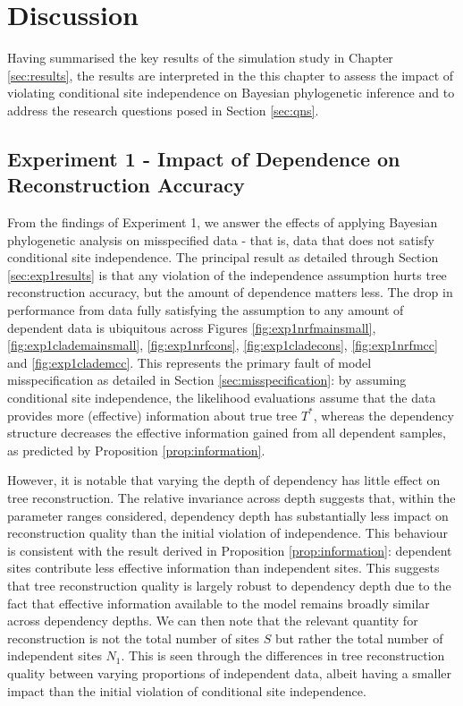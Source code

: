 \chapter{Discussion}
\label{sec:discussion}

Having summarised the key results of the simulation study in Chapter \ref{sec:results}, the results are interpreted in the this chapter to assess the impact of violating conditional site independence on Bayesian phylogenetic inference and to address the research questions posed in Section \ref{sec:qns}.

\section{Experiment 1 - Impact of Dependence on Reconstruction Accuracy}
\label{sec:discussionexp1}
From the findings of Experiment 1, we answer the effects of applying Bayesian phylogenetic analysis on misspecified data - that is, data that does not satisfy conditional site independence. The principal result as detailed through Section \ref{sec:exp1results} is that any violation of the independence assumption hurts tree reconstruction accuracy, but the amount of dependence matters less. The drop in performance from data fully satisfying the assumption to any amount of dependent data is ubiquitous across Figures \ref{fig:exp1nrfmainsmall}, \ref{fig:exp1clademainsmall}, \ref{fig:exp1nrfcons}, \ref{fig:exp1cladecons}, \ref{fig:exp1nrfmcc} and \ref{fig:exp1clademcc}. This represents the primary fault of model misspecification as detailed in Section \ref{sec:misspecification}: by assuming conditional site independence, the likelihood evaluations assume that the data provides more (effective) information about true tree $T^*$, whereas the dependency structure decreases the effective information gained from all dependent samples, as predicted by Proposition \ref{prop:information}. 

However, it is notable that varying the depth of dependency has little effect on tree reconstruction. The relative invariance across depth suggests that, within the parameter ranges considered, dependency depth has substantially less impact on reconstruction quality than the initial violation of independence. This behaviour is consistent with the result derived in Proposition \ref{prop:information}: dependent sites contribute less effective information than independent sites. This suggests that tree reconstruction quality is largely robust to dependency depth due to the fact that effective information available to the model remains broadly similar across dependency depths. We can then note that the relevant quantity for reconstruction is not the total number of sites $S$ but rather the total number of independent sites $N_1$. This is seen through the differences in tree reconstruction quality between varying proportions of independent data, albeit having a smaller impact than the initial violation of conditional site independence.

